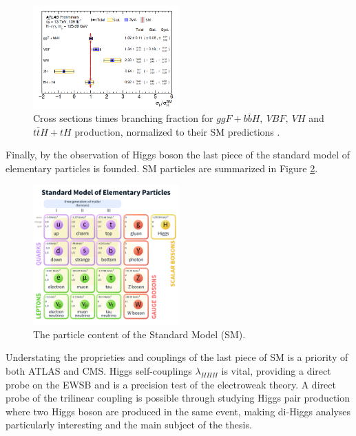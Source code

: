 \begin{figure}[H]
    \centering
    \includegraphics[width=0.5\textwidth]{Ch1/Img/HXsecRun2.png}
    \caption{Cross sections times branching fraction for $ggF+b\bar{b}H , \ VBF, \ VH$ and $t\bar{t}H + tH$ production, normalized to their SM predictions \cite{ATLAS_2020}.}
    \label{fig:chap1:H2012:HXsecRun2}
\end{figure}
Finally, by the observation of Higgs boson the last piece of the standard model of elementary particles is founded. SM particles are summarized in Figure \ref{fig:chap1:H2012:SM}.
\begin{figure}[H]
    \centering
    \includegraphics[width=0.5\textwidth]{Ch1/Img/SM_particles.png}
    \caption{The particle content of the Standard Model (SM).}
    \label{fig:chap1:H2012:SM}
\end{figure}
Understating the proprieties and couplings of the last piece of SM is a priority of both ATLAS and CMS. Higgs self-couplings $\lambda_{HHH}$ is vital, providing a direct probe on the EWSB and is a precision test of the electroweak theory. A direct probe of the trilinear coupling is possible through studying Higgs pair production where two Higgs boson are produced in the same event, making di-Higgs analyses particularly interesting and the main subject of the thesis.

